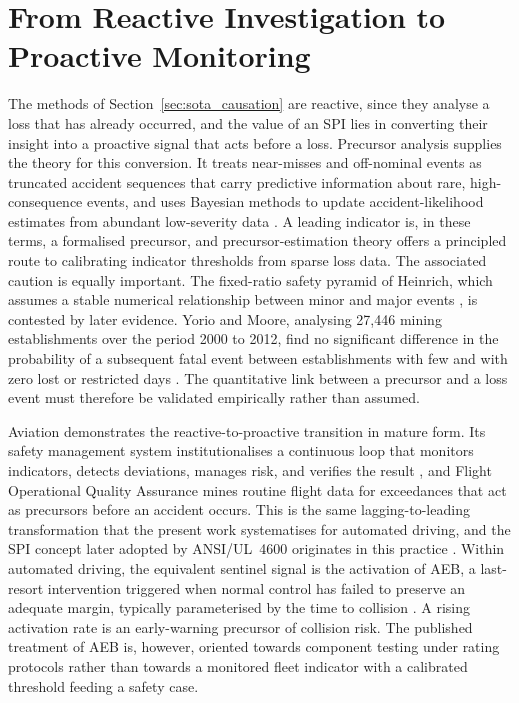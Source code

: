 \section{From Reactive Investigation to Proactive Monitoring}
\label{sec:sota_reactive_proactive}

The methods of Section~\ref{sec:sota_causation} are reactive, since they analyse a loss
that has already occurred, and the value of an \ac{SPI} lies in converting their
insight into a proactive signal that acts before a loss. Precursor analysis supplies the
theory for this conversion. It treats near-misses and off-nominal events as truncated
accident sequences that carry predictive information about rare, high-consequence
events, and uses Bayesian methods to update accident-likelihood estimates from
abundant low-severity data \cite{bieryi1995,saleh2013}. A leading indicator is, in
these terms, a formalised precursor, and precursor-estimation theory offers a
principled route to calibrating indicator thresholds from sparse loss data. The
associated caution is equally important. The fixed-ratio safety pyramid of Heinrich,
which assumes a stable numerical relationship between minor and major events
\cite{heinrich1931}, is contested by later evidence. Yorio and Moore, analysing 27,446
mining establishments over the period 2000 to 2012, find no significant difference in
the probability of a subsequent fatal event between establishments with few and with
zero lost or restricted days \cite{yoriomoore2018}. The quantitative link between a
precursor and a loss event must therefore be validated empirically rather than assumed.

Aviation demonstrates the reactive-to-proactive transition in mature form. Its safety
management system institutionalises a continuous loop that monitors indicators,
detects deviations, manages risk, and verifies the result \cite{icao9859}, and Flight
Operational Quality Assurance mines routine flight data for exceedances that act as
precursors before an accident occurs. This is the same lagging-to-leading
transformation that the present work systematises for automated driving, and the
\ac{SPI} concept later adopted by ANSI/UL~4600 originates in this practice \cite{icao9859}.
Within automated driving, the equivalent sentinel signal is the activation of
\ac{AEB}, a last-resort intervention triggered when normal control
has failed to preserve an adequate margin, typically parameterised by the time to collision
\cite{eNCAP_aeb}. A rising activation rate is an early-warning precursor of collision
risk. The published treatment of \ac{AEB} is, however, oriented
towards component testing under rating protocols rather than towards a monitored fleet
indicator with a calibrated threshold feeding a safety case.


